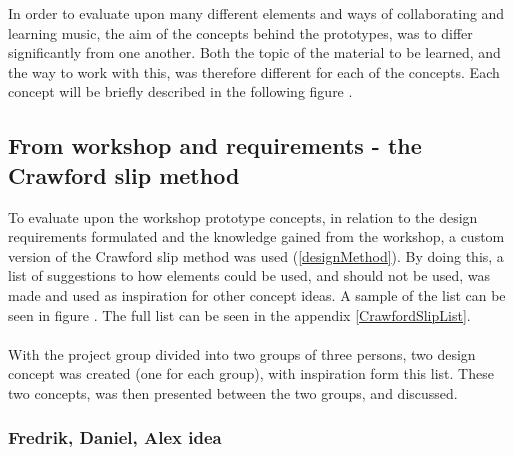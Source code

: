 In order to evaluate upon many different elements and ways of collaborating and learning music, the aim of the concepts behind the prototypes, was to differ significantly from one another. Both the topic of the material to be learned, and the way to work with this, was therefore different for each of the concepts. Each concept will be briefly described in the following figure . 


\subsection{From workshop and requirements - the Crawford slip method}
To evaluate upon the workshop prototype concepts, in relation to the design requirements formulated and the knowledge gained from the workshop, a custom version of the Crawford slip method was used (\autoref{designMethod}). By doing this, a list of suggestions to how elements could be used, and should not be used, was made and used as inspiration for other concept ideas. A sample of the list can be seen in figure . The full list can be seen in the appendix \autoref{CrawfordSlipList}.  
\\\\


With the project group divided into two groups of three persons, two design concept was created (one for each group), with inspiration form this list. These two concepts, was then presented between the two groups, and discussed.  

\subsubsection{Fredrik, Daniel, Alex idea}

